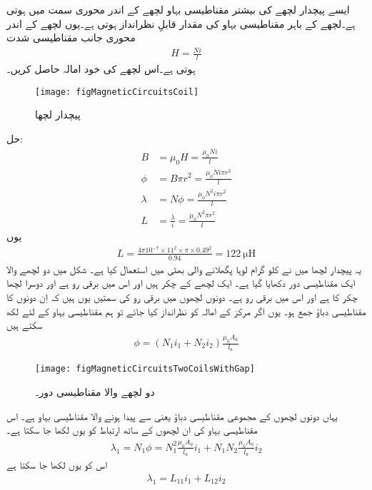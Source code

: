 ایسے پیچدار لچھے کی بیشتر مقناطیسی بہاو لچھے کے اندر محوری سمت میں ہوتی ہے۔لچھے کے باہر مقناطیسی بہاو کی مقدار قابلِ نظرانداز ہوتی ہے۔یوں لچھے کے اندر محوری جانب مقناطیسی شدت
\begin{align*}
H=\frac{N i}{l}
\end{align*}
ہوتی ہے۔اس لچھے کی خود امالہ حاصل کریں۔
\begin{figure}
\centering
\texttt{[image: figMagneticCircuitsCoil]}
\caption{پیچدار لچھا}
\label{شکل_مقناطیسی_ادوار_پیچدار_لچھا}
\end{figure}
حل:
\begin{align*}
B&=\mu_0 H=\frac{\mu_0 N i}{l}\\
\phi&=B  \pi r^2=\frac{\mu_0 N i \pi r^2}{l}\\ 
\lambda&=N \phi =\frac{\mu_0 N^2 i \pi r^2}{l}\\ 
L&=\frac{\lambda}{i}=\frac{\mu_0 N^2 \pi r^2}{l}
\end{align*} 
یوں
\begin{align*}
L=\frac{4 \pi 10^{-7} \times 11^2 \times \pi  \times 0.49^2}{0.94}=\SI{122}{\micro \henry}
\end{align*}
یہ پیچدار لچھا میں نے   کلو گرام لوہا پگھلانے والی بھٹی میں استعمال کیا ہے۔
%
شکل  میں دو لچھے والا ایک مقناطیسی دور دکھایا گیا ہے۔ ایک لچھے کے   چکر ہیں اور اس میں برقی رو  ہے اور دوسرا لچھا  چکر کا ہے اور اس میں برقی  رو  ہے۔ دونوں لچھوں میں برقی رو کی سمتیں یوں ہیں کہ اِن  دونوں کا مقناطیسی دباؤ جمع ہو۔ یوں اگر مرکز کے امالہ کو نظرانداز کیا جائے تو ہم مقناطیسی بہاو  کے لئے لکھ سکتے ہیں
\begin{align}
\phi=\left (N_1 i_1 +N_2 i_2 \right ) \frac{\mu_0 A_a}{l_a}
\end{align} 
%
\begin{figure}
\centering
\texttt{[image: figMagneticCircuitsTwoCoilsWithGap]}
\caption{دو لچھے والا مقناطیسی دور۔}
\label{شکل_مقناطیسی_ادوار_دو_لچھے_ایک_درز}
\end{figure}
یہاں  دونوں لچھوں کے مجموعی مقناطیسی دباؤ یعنی  سے پیدا ہونے والا مقناطیسی بہاو ہے۔ اس مقناطیسی بہاو  کی ان  لچھوں  کے ساتھ  ارتباط کو یوں لکھا جا سکتا ہے۔
\begin{align}
\lambda_1=N_1 \phi=N_1^2  \frac{\mu_0 A_a}{l_a} i_1 +N_1 N_2  \frac{\mu_0 A_a}{l_a} i_2
\end{align}
اس کو یوں لکھا جا سکتا ہے
\begin{align}\label{مساوات_مقناطیسی_دور_ارتباط_دو_لچھے}
\lambda_1 = L_{11} i_1+L_{12} i_2
\end{align}

